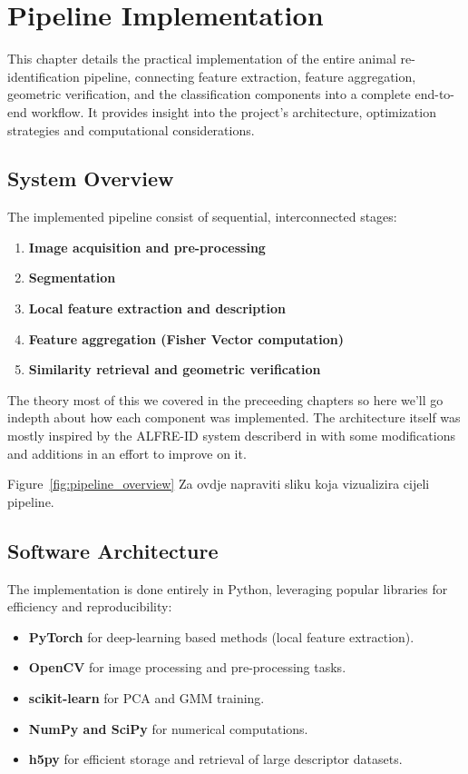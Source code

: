 \chapter{Pipeline Implementation}
\label{chap:pipeline}
This chapter details the practical implementation of the entire animal re-identification pipeline, connecting feature extraction, feature aggregation, geometric verification, and the classification components into a complete end-to-end workflow. It provides insight into the project's architecture, optimization strategies and computational considerations.

\section{System Overview}
\label{sec:system_overview}

The implemented pipeline consist of sequential, interconnected stages:

\begin{enumerate}
    \item \textbf{Image acquisition and pre-processing}
    \item \textbf{Segmentation}
    \item \textbf{Local feature extraction and description}
    \item \textbf{Feature aggregation (Fisher Vector computation)}
    \item  \textbf{Similarity retrieval and geometric verification}
\end{enumerate}

 The theory most of this we covered in the preceeding chapters so here we'll go indepth about how each component was implemented. The architecture itself was mostly inspired by the ALFRE-ID system describerd in \cite{springerSpeciesAgnosticPatterned} with some modifications and additions in an effort to improve on it.

 Figure~\ref{fig:pipeline_overview} Za ovdje napraviti sliku koja vizualizira cijeli pipeline.

\section{Software Architecture}
\label{sec:software_architecture}

The implementation is done entirely in Python, leveraging popular libraries for efficiency and reproducibility:

\begin{itemize}
    \item \textbf{PyTorch} for deep-learning based methods (local feature extraction).
    \item \textbf{OpenCV} for image processing and pre-processing tasks.
    \item \textbf{scikit-learn} for PCA and GMM training.
    \item \textbf{NumPy and SciPy} for numerical computations.
    \item \textbf{h5py} for efficient storage and retrieval of large descriptor datasets.
\end{itemize}


